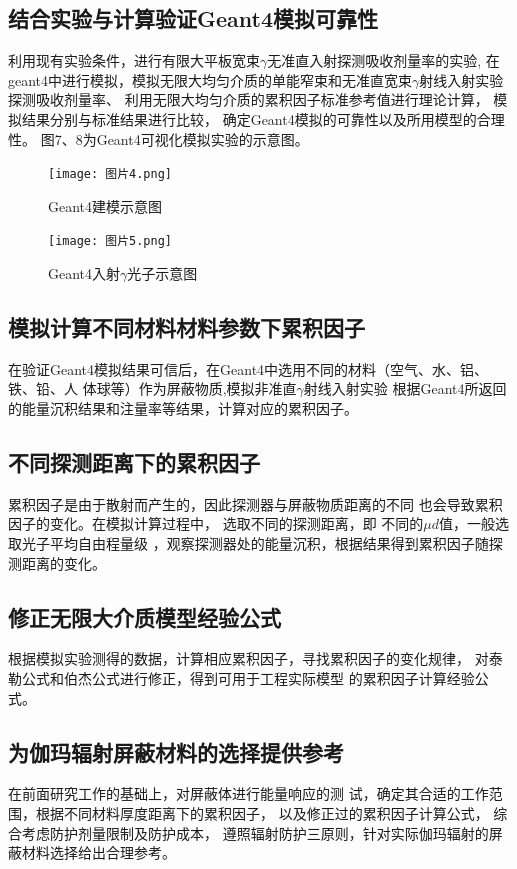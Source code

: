 \subsection{结合实验与计算验证Geant4模拟可靠性}
利用现有实验条件，进行有限大平板宽束$\gamma$无准直入射探测吸收剂量率的实验,
在geant4中进行模拟，模拟无限大均匀介质的单能窄束和无准直宽束$\gamma$射线入射实验
探测吸收剂量率、
利用无限大均匀介质的累积因子标准参考值进行理论计算，
模拟结果分别与标准结果进行比较，
确定Geant4模拟的可靠性以及所用模型的合理性。
图7、8为Geant4可视化模拟实验的示意图。
\begin{figure}[htbp]
    \centering
    \begin{minipage}[t]{0.45\textwidth}
    \centering
    \texttt{[image: 图片4.png]}
    \caption{Geant4建模示意图}
    \end{minipage}
    \centering
    \begin{minipage}[t]{0.45\textwidth}
    \centering
    \texttt{[image: 图片5.png]}
    \caption{Geant4入射$\gamma$光子示意图}
    \end{minipage}
    \end{figure}
\subsection{模拟计算不同材料材料参数下累积因子}
在验证Geant4模拟结果可信后，在Geant4中选用不同的材料（空气、水、铝、铁、铅、人
体球等）作为屏蔽物质,模拟非准直$\gamma$射线入射实验
根据Geant4所返回的能量沉积结果和注量率等结果，计算对应的累积因子。
\subsection{不同探测距离下的累积因子}
累积因子是由于散射而产生的，因此探测器与屏蔽物质距离的不同
也会导致累积因子的变化。在模拟计算过程中， 选取不同的探测距离，即
不同的$\mu d$值，一般选取光子平均自由程量级
，观察探测器处的能量沉积，根据结果得到累积因子随探测距离的变化。
\subsection{修正无限大介质模型经验公式}
根据模拟实验测得的数据，计算相应累积因子，寻找累积因子的变化规律，
对泰勒公式和伯杰公式进行修正，得到可用于工程实际模型
的累积因子计算经验公式。
\subsection{为伽玛辐射屏蔽材料的选择提供参考}
在前面研究工作的基础上，对屏蔽体进行能量响应的测
试，确定其合适的工作范围，根据不同材料厚度距离下的累积因子，
以及修正过的累积因子计算公式，
综合考虑防护剂量限制及防护成本，
遵照辐射防护三原则，针对实际伽玛辐射的屏蔽材料选择给出合理参考。

